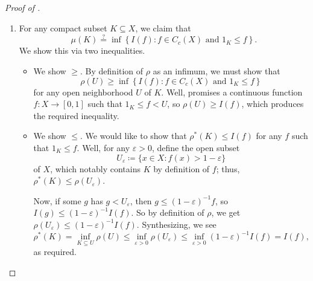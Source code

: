 \documentclass[../notes.tex]{subfiles}
\begin{document}
\begin{proof}[Proof of ]
\begin{enumerate}
		Well, let's reduce our check to something we can check on opens. By definition of $\rho^*$ as an infimum, it is enough to show that any open subset $V$ containing $E$ will achieve
		\[\rho^*(V)\stackrel?\ge\rho^*(E\cap U)+\rho^*(E\setminus U),\]
		but by monotonicity, it will be enough for
		\[\rho^*(V)\stackrel?\ge\rho^*(V\cap U)+\rho^*(V\setminus U).\]
		Note we may replace the first two $\rho^*$s with $\rho$s. As such, by definition of $\rho$, it is enough to show that
		\[\rho(V)\stackrel?\ge I(f)+\rho^*(V\setminus U)\]
		for any $f<(V\cap U)$. Define $K\coloneqq\op{supp}f$, which is notably closed, and we actually claim that
		\[\rho(V)\stackrel?\ge I(f)+\rho(V\setminus K),\]
		which will be enough by monotonicity: $K\subseteq U$ implies $V\setminus K\supseteq V\setminus U$, which implies $\rho(V\setminus K)=\rho^*(V\setminus K)\ge\rho^*(V\setminus U)$. Well, for this, by definition of $\rho$, we know that it is enough to check
		\[\rho(V)\stackrel?\ge I(f)+I(g)\]
		for any $g<V\setminus K$. Well, $I(f)+I(g)=I(f+g)$, and $f+g$ is supported on $V$, where the $f$ piece is supported on $f$, and the $g$ piece is supported on $V\setminus K$. So the above claim follows by definition of $\rho$.

		For the rest of the proof, we let $\mu$ denote our Borel measure.

		\item For any compact subset $K\subseteq X$, we claim that
		\[\mu(K)\stackrel?=\inf\left\{I(f):f\in C_c(X)\text{ and }1_K\le f\right\}.\]
		We show this via two inequalities.
		\begin{itemize}
			\item We show $\ge$. By definition of $\rho$ as an infimum, we must show that
			\[\rho(U)\ge\inf\left\{I(f):f\in C_c(X)\text{ and }1_K\le f\right\}\]
			for any open neighborhood $U$ of $K$. Well,  promises a continuous function $f\colon X\to[0,1]$ such that $1_K\le f<U$, so $\rho(U)\ge I(f)$, which produces the required inequality.
			\item We show $\le$. We would like to show that $\rho^*(K)\le I(f)$ for any $f$ such that $1_K\le f$. Well, for any $\varepsilon>0$, define the open subset
			\[U_\varepsilon\coloneqq\{x\in X:f(x)>1-\varepsilon\}\]
			of $X$, which notably contains $K$ by definition of $f$; thus, $\rho^*(K)\le\rho(U_\varepsilon)$.
			
			Now, if some $g$ has $g<U_\varepsilon$, then $g\le(1-\varepsilon)^{-1}f$, so $I(g)\le(1-\varepsilon)^{-1}I(f)$. So by definition of $\rho$, we get $\rho(U_\varepsilon)\le(1-\varepsilon)^{-1}I(f)$. Synthesizing, we see
			\[\rho^*(K)=\inf_{K\subseteq U}\rho(U)\le\inf_{\varepsilon>0}\rho(U_\varepsilon)\le\inf_{\varepsilon>0}(1-\varepsilon)^{-1}I(f)=I(f),\]
			as required.
		\end{itemize}


\end{enumerate}
\end{proof}
\end{document}
